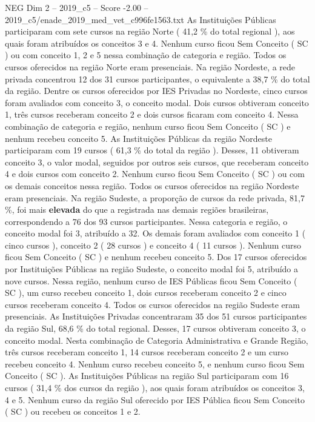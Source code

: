 \begin{textsample}{NEG Dim 2 – 2019\_c5 – Score -2.00 – 2019\_c5/enade\_2019\_med\_vet\_c996fe1563.txt}
As Instituições Públicas participaram com sete cursos na região Norte ( 41,2 \% do total regional ), aos quais foram atribuídos os conceitos 3 e 4.
Nenhum curso ficou Sem Conceito ( SC ) ou com conceito 1, 2 e 5 nessa combinação de categoria e região.
Todos os cursos oferecidos na região Norte eram presenciais.
Na região Nordeste, a rede privada concentrou 12 dos 31 cursos participantes, o equivalente a 38,7 \% do total da região.
Dentre os cursos oferecidos por IES Privadas no Nordeste, cinco cursos foram avaliados com conceito 3, o conceito modal.
Dois cursos obtiveram conceito 1, três cursos receberam conceito 2 e dois cursos ficaram com conceito 4.
Nessa combinação de categoria e região, nenhum curso ficou Sem Conceito ( SC ) e nenhum recebeu conceito 5.
As Instituições Públicas da região Nordeste participaram com 19 cursos ( 61,3 \% do total da região ).
Desses, 11 obtiveram conceito 3, o valor modal, seguidos por outros seis cursos, que receberam conceito 4 e dois cursos com conceito 2.
Nenhum curso ficou Sem Conceito ( SC ) ou com os demais conceitos nessa região.
Todos os cursos oferecidos na região Nordeste eram presenciais.
Na região Sudeste, a proporção de cursos da rede privada, 81,7 \%, foi mais \textbf{elevada} do que a registrada nas demais regiões brasileiras, correspondendo a 76 dos 93 cursos participantes.
Nessa categoria e região, o conceito modal foi 3, atribuído a 32.
Os demais foram avaliados com conceito 1 ( cinco cursos ), conceito 2 ( 28 cursos ) e conceito 4 ( 11 cursos ).
Nenhum curso ficou Sem Conceito ( SC ) e nenhum recebeu conceito 5.
Dos 17 cursos oferecidos por Instituições Públicas na região Sudeste, o conceito modal foi 5, atribuído a nove cursos.
Nessa região, nenhum curso de IES Públicas ficou Sem Conceito ( SC ), um curso recebeu conceito 1, dois cursos receberam conceito 2 e cinco cursos receberam conceito 4.
Todos os cursos oferecidos na região Sudeste eram presenciais.
As Instituições Privadas concentraram 35 dos 51 cursos participantes da região Sul, 68,6 \% do total regional.
Desses, 17 cursos obtiveram conceito 3, o conceito modal.
Nesta combinação de Categoria Administrativa e Grande Região, três cursos receberam conceito 1, 14 cursos receberam conceito 2 e um curso recebeu conceito 4.
Nenhum curso recebeu conceito 5, e nenhum curso ficou Sem Conceito ( SC ).
As Instituições Públicas na região Sul participaram com 16 cursos ( 31,4 \% dos cursos da região ), aos quais foram atribuídos os conceitos 3, 4 e 5.
Nenhum curso da região Sul oferecido por IES Pública ficou Sem Conceito ( SC ) ou recebeu os conceitos 1 e 2.

\end{textsample}
